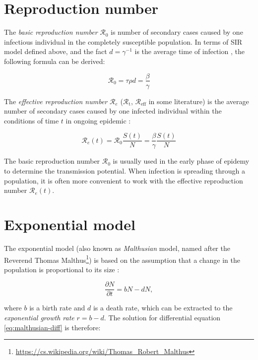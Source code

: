 \documentclass[
  digital, %
  oneside, %
  lof,     %
  lot,     %
]{fithesis4}
\begin{document}
\section{Reproduction number}

The \textit{basic reproduction number} $\mathcal{R}_0$ is number of secondary cases caused by one infectious individual in the completely susceptible population.
In terms of SIR model defined above, and the fact $d = \gamma^{-1}$ is the average time of infection \cite{ma2019}, the following formula can be derived:

\begin{equation}
	\mathcal{R}_0 = \tau \rho d = \frac{\beta}{\gamma}
\end{equation}

The \textit{effective reproduction number} $\mathcal{R}_e$ ($\mathcal{R}_{\text{t}}$, $\mathcal{R}_{\text{eff}}$ in some literature) is the average number of secondary cases caused by one infected individual within the conditions of time $t$ in ongoing epidemic \cite{chowell2016}:

\begin{equation}
  \label{eq:sir-effective-reproduction-number}
	\mathcal{R}_e(t) = \mathcal{R}_0 \frac{S(t)}{N} = \frac{\beta}{\gamma} \frac{S(t)}{N}
\end{equation}

The basic reproduction number $\mathcal{R}_0$ is usually used in the early phase of epidemy to determine the transmission potential.
When infection is spreading through a population, it is often more convenient to work with the effective reproduction number $\mathcal{R}_e(t)$.


\section{Exponential model}

The exponential model (also known as \textit{Malthusian} model, named after the Reverend Thomas Malthus\footnote{\url{https://cs.wikipedia.org/wiki/Thomas_Robert_Malthus}}) is based on the assumption that a change in the population is proportional to its size \cite{martcheva2015}:

\begin{equation}\label{eq:malthusian-diff}
  \frac{\partial N}{\partial t} = b N - d N,
\end{equation}

\noindent
where $b$ is a birth rate and $d$ is a death rate, which can be extracted to the \textit{exponential growth rate} $r = b - d$.
The solution for differential equation \eqref{eq:malthusian-diff} is therefore:
\end{document}

